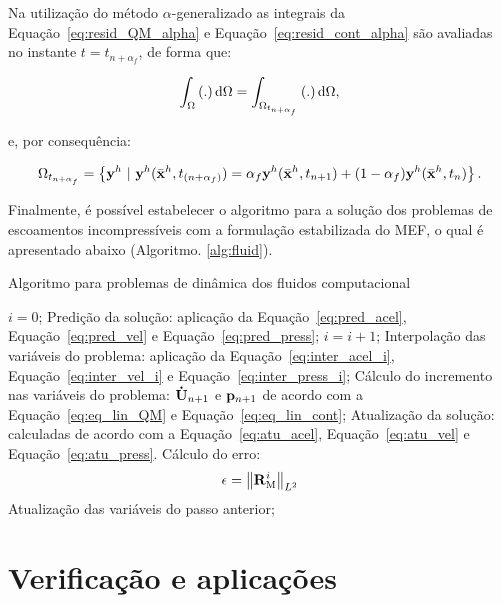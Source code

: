 Na utilização do método $\alpha$-generalizado as integrais da Equação~\eqref{eq:resid_QM_alpha} e Equação~\eqref{eq:resid_cont_alpha} são avaliadas no instante $t = t_{n+\alpha_{f}}$, de forma que:

\begin{align}
\int_{\Omega} \left(.\right) \mathrm{d} \Omega = \int_{\Omega_{t_{n+\alpha_{f}}}} \left(.\right) \mathrm{d} \Omega,
\end{align}

\noindent e, por consequência:

\begin{align}
\Omega_{t_{n+\alpha_{f}}} = \left\{\mathbf{y}^h \  |\  \mathbf{y}^h(\bar{\mathbf{x}}^h,t_{(n+\alpha_f)}) = \alpha_f \mathbf{y}^h(\bar{\mathbf{x}}^h,t_{n+1}) + (1-\alpha_f) \mathbf{y}^h(\bar{\mathbf{x}}^h,t_n)  \right\}.
\end{align}

Finalmente, é possível estabelecer o algoritmo para a solução dos problemas de escoamentos incompressíveis com a formulação estabilizada do MEF, o qual é apresentado abaixo (Algoritmo. \ref{alg:fluid}).

\begin{algorithm}
	\caption{Algoritmo para problemas de dinâmica dos fluidos computacional}
	\label{alg:fluid}
	\begin{algorithmic}[1]
		\State $i=0$;
		\State Predição da solução: aplicação da Equação~\eqref{eq:pred_acel}, Equação~\eqref{eq:pred_vel} e Equação~\eqref{eq:pred_press};
		\State $i=i+1$;
		\State Interpolação das variáveis do problema: aplicação da Equação~\eqref{eq:inter_acel_i}, Equação~\eqref{eq:inter_vel_i} e Equação~\eqref{eq:inter_press_i};
		\State Cálculo do incremento nas variáveis do problema: $\mathbf{\dot{U}}_{n+1}$ e $\mathbf{p}_{n+1}$ de acordo com a Equação~\eqref{eq:eq_lin_QM} e Equação~\eqref{eq:eq_lin_cont};
		\State Atualização da solução: calculadas de acordo com a Equação~\eqref{eq:atu_acel}, Equação~\eqref{eq:atu_vel} e Equação~\eqref{eq:atu_press}.
		\State Cálculo do erro:
		\begin{align}
		\epsilon =\left\| \mathbf{R}_\mathrm{M}^i \right\|_{L^2}
		\end{align}
		\EndWhile
		\State Atualização das variáveis do passo anterior;
		\EndFor
	\end{algorithmic}
\end{algorithm}

\section{Verificação e aplicações} \label{capitulo:Cap2:VerApl}

